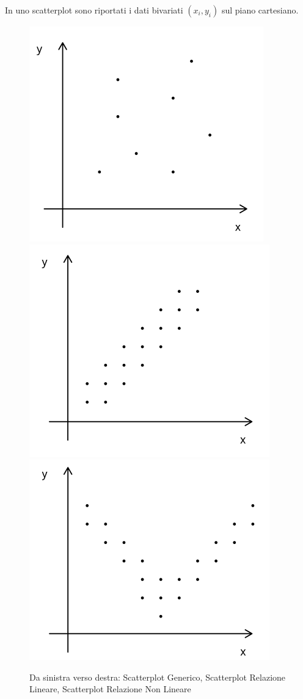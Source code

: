 \documentclass{article}
\begin{document}
In uno scatterplot sono riportati i dati bivariati $(x_{i}, y_{i})$ sul piano cartesiano.

\begin{figure}[htbp]
    \center
    \includegraphics[scale=0.325]{img/scatterplot.png}
    \includegraphics[scale=0.325]{img/scatterplotLineare.png}
    \includegraphics[scale=0.325]{img/scatterplotNonLineare.png}
    \caption{Da sinistra verso destra: Scatterplot Generico, Scatterplot Relazione Lineare, Scatterplot Relazione Non Lineare}
\end{figure}
\end{document}
